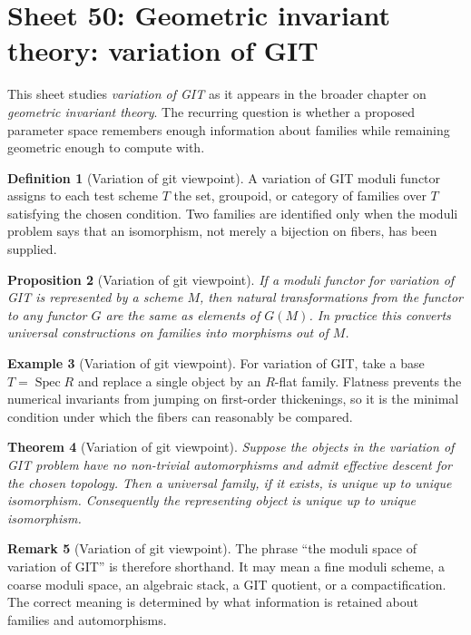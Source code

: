 \documentclass[11pt]{amsart}
\newtheorem{theorem}{Theorem}[section]
\newtheorem{proposition}[theorem]{Proposition}
\theoremstyle{definition}
\newtheorem{definition}[theorem]{Definition}
\newtheorem{example}[theorem]{Example}
\newtheorem{remark}[theorem]{Remark}
\newcommand{\Spec}{\operatorname{Spec}}
\begin{document}
\section{Sheet 50: Geometric invariant theory: variation of GIT}
This sheet studies \emph{variation of GIT} as it appears in the broader chapter on \emph{geometric invariant theory}.  The recurring question is whether a proposed parameter space remembers enough information about families while remaining geometric enough to compute with.
\begin{definition}[Variation of git viewpoint]
A variation of GIT moduli functor assigns to each test scheme $T$ the set, groupoid, or category of families over $T$ satisfying the chosen condition.  Two families are identified only when the moduli problem says that an isomorphism, not merely a bijection on fibers, has been supplied.
\end{definition}
\begin{proposition}[Variation of git viewpoint]
If a moduli functor for variation of GIT is represented by a scheme $M$, then natural transformations from the functor to any functor $G$ are the same as elements of $G(M)$.  In practice this converts universal constructions on families into morphisms out of $M$.
\end{proposition}
\begin{example}[Variation of git viewpoint]
For variation of GIT, take a base $T=\Spec R$ and replace a single object by an $R$-flat family.  Flatness prevents the numerical invariants from jumping on first-order thickenings, so it is the minimal condition under which the fibers can reasonably be compared.
\end{example}
\begin{theorem}[Variation of git viewpoint]
Suppose the objects in the variation of GIT problem have no non-trivial automorphisms and admit effective descent for the chosen topology.  Then a universal family, if it exists, is unique up to unique isomorphism.  Consequently the representing object is unique up to unique isomorphism.
\end{theorem}
\begin{remark}[Variation of git viewpoint]
The phrase ``the moduli space of variation of GIT'' is therefore shorthand.  It may mean a fine moduli scheme, a coarse moduli space, an algebraic stack, a GIT quotient, or a compactification.  The correct meaning is determined by what information is retained about families and automorphisms.
\end{remark}
\end{document}
